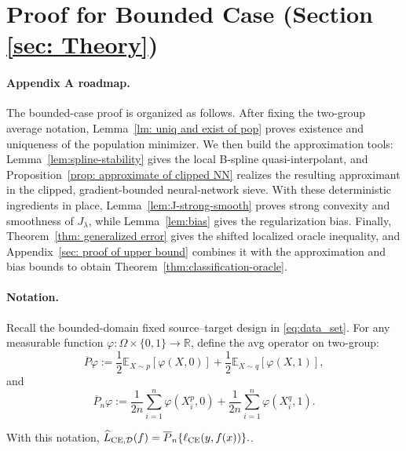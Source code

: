 \documentclass[11pt]{article}
\newcommand{\E}{\mathbb{E}}
\theoremstyle{plain}
\theoremstyle{definition}
\theoremstyle{remark}
\begin{document}
\section{Proof for Bounded Case (Section \ref{sec: Theory})}\label{sec: proof of bounded case}

\paragraph{Appendix A roadmap.}
The bounded-case proof is organized as follows. After fixing the two-group
average notation, Lemma~\ref{lm: uniq and exist of pop} proves existence and
uniqueness of the population minimizer. We then build the approximation
tools: Lemma~\ref{lem:spline-stability} gives the local B-spline
quasi-interpolant, and Proposition~\ref{prop: approximate of clipped NN}
realizes the resulting approximant in the clipped, gradient-bounded
neural-network sieve. With these deterministic ingredients in place,
Lemma~\ref{lem:J-strong-smooth} proves strong convexity and smoothness of
\(J_\lambda\), while Lemma~\ref{lem:bias} gives the regularization bias.
Finally, Theorem~\ref{thm: generalized error} gives the shifted localized
oracle inequality, and Appendix~\ref{sec: proof of upper bound} combines it
with the approximation and bias bounds to obtain
Theorem~\ref{thm:classification-oracle}.

\paragraph{Notation.}

Recall the bounded-domain fixed source--target design in \eqref{eq:data_set}. For any measurable
function \(\varphi:\Omega\times\{0,1\}\to\mathbb R\), define the avg operator on two-group:
\[
\overline P\varphi:=
\frac12\E_{X\sim p}[\varphi(X,0)]
+
\frac12\E_{X\sim q}[\varphi(X,1)],
\]
and
\[
\overline P_n\varphi:=
\frac{1}{2n}\sum_{i=1}^n\varphi(X_i^p,0)
+
\frac{1}{2n}\sum_{i=1}^n\varphi(X_i^q,1).
\]

With this notation,
$
  \widehat L_{\rm CE,\mathcal D}(f)
  =
  \overline P_n\{\ell_{\rm CE}(y,f(x))\}.
$.
\end{document}
